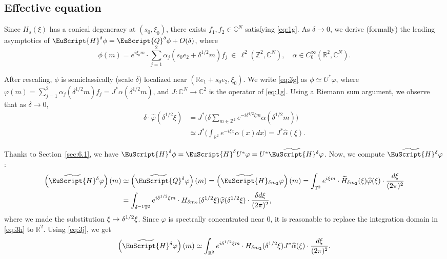 \documentclass[10pt]{amsart}
\let\pazocal\EuScript
\def\mto{\mathchoice{\longmapsto}{\mapsto}{\mapsto}{\mapsto}}
\theoremstyle{definition}
\newcommand{\QQ}{{\pazocal{Q}}}
\newcommand{\HH}{\pazocal{H}}
\newcommand{\tHH}{\widetilde{\HH}{}}
\newcommand{\tQQ}{\widetilde{\QQ}{}}
\newcommand{\C}{\mathbb{C}}
\newcommand{\R}{\mathbb{R}}
\newcommand{\Z}{\mathbb{Z}}
\newcommand{\Tt}{{\mathbb{T}}}
\let\az\alpha
\let\vp\varphi
\newcommand{\tH}{{\widetilde{H}}}
\newcommand{\hvp}{{\widehat{\vp}}}
\newcommand{\haz}{{\widehat{\az}}}
\begin{document}
\subsection{Effective equation} Since $H_s(\xi)$ has a conical degeneracy at $(s_0,\xi_0)$, there exists $f_1, f_2 \in \C^N$ satisfying \eqref{eq:1g}. As $\delta \to 0$, we derive (formally) the leading asymptotics of $\HH^\delta \phi = \QQ^\delta \phi + O(\delta)$, where
\begin{equation}\label{eq:3g}
\phi(m) = e^{i\xi_0 m} \cdot \sum_{j=1}^2 \az_j(s_0 e_2+\delta^{1/2} m) f_j \ \in \ \ell^2(\Z^2,\C^N), \quad \az \in C_0^\infty(\R^2,\C^N).
\end{equation}

After rescaling, $\phi$ is semiclassically (scale $\delta$) localized near $(\R e_1 + s_0e_2,\xi_0)$.
We write \eqref{eq:3g} as $\phi \simeq U^* \vp$, where $\vp(m) = \sum_{j=1}^2 \az_j(\delta^{1/2} m) f_j = J^* \az(\delta^{1/2} m)$,
and $J : \C^N \to \C^2$ is the operator of \eqref{eq:1g}. Using a Riemann sum argument, we observe that as $\delta \to 0$,
\begin{equation}\label{eq:3j}
\begin{split}
\delta \cdot \hvp(\delta^{1/2} \xi) &= J^* \biggl( \delta \sum_{m \in \Z^2} e^{-i \delta^{1/2} \xi m} \az(\delta^{1/2} m) \biggr)\\
&\simeq J^* \biggl( \int_{\R^2} e^{-i \xi x} \az(x) dx\biggr) = J^* \haz(\xi).
\end{split}
\end{equation}

Thanks to Section~\ref{sec:6.1}, we have $\HH^\delta \phi = \HH^\delta U^* \vp = U^* \tHH^\delta \vp$. Now, we compute $\tHH^\delta \vp$:
\begin{equation}\label{eq:3h}
\begin{split}
\left(\tHH^\delta \vp \right)(m) &\simeq \left(\tQQ^\delta \vp\right)(m) = \left(\tHH_{\delta m_2} \vp\right)(m) = \int_{\Tt^2} e^{i\xi m} \cdot \tH_{\delta m_2}(\xi) \hvp(\xi) \cdot \dfrac{d\xi}{(2\pi)^2}
\\
&= \int_{\delta^{-1} \Tt^2} e^{i\delta^{1/2} \xi m} \cdot H_{\delta m_2}(\delta^{1/2} \xi) \hvp(\delta^{1/2} \xi) \cdot \dfrac{\delta d\xi}{(2\pi)^2},
\end{split}
\end{equation}
where we made the substitution $\xi \mto \delta^{1/2} \xi$. Since $\vp$ is spectrally concentrated near $0$, it is reasonable to replace the integration domain in \eqref{eq:3h} to $\R^2$. Using \eqref{eq:3j}, we get
\begin{equation}\label{eq:3m}
\left(\tHH^\delta \vp \right)(m) \simeq \int_{\R^2} e^{i\delta^{1/2} \xi m} \cdot H_{\delta m_2}(\delta^{1/2} \xi) J^* \haz(\xi) \cdot \dfrac{d\xi}{(2\pi )^2}.
\end{equation}
\end{document}
